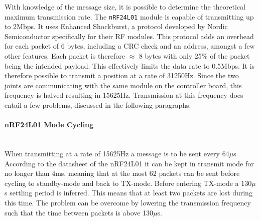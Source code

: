 With knowledge of the message size, it is possible to determine the theoretical maximum transmission rate.
The \texttt{nRF24L01} module is capable of transmitting up to 2Mbps.
It uses Enhanced Shockburst, a protocol developed by Nordic Semiconductor specifically for their RF modules.
This protocol adds an overhead for each packet of 6 bytes, including a CRC check and an address, amongst a few other features.
Each packet is therefore $\approx$ 8 bytes with only 25\% of the packet being the intended payload.
This effectively limits the data rate to 0.5Mbps.
It is therefore possible to transmit a position at a rate of 31250Hz.
Since the two joints are communicating with the same module on the controller board, this frequency is halved resulting in 15625Hz.
Transmission at this frequency does entail a few problems, discussed in the following paragraphs.
\paragraph{nRF24L01 Mode Cycling}~\\ %
\label{par:nrf24l01_mode_cycling}
When transmitting at a rate of 15625Hz a message is to be sent every 64$\mu$s
According to the datasheet of the nRF24L01 it can be kept in transmit mode for no longer than 4ms, meaning that at the most 62 packets can be sent before cycling to standby-mode and back to TX-mode.
Before entering TX-mode a 130$\mu$s settling period is inferred.
This means that at least two packets are lost during this time.
The problem can be overcome by lowering the transmission frequency such that the time between packets is above 130$\mu$s.


